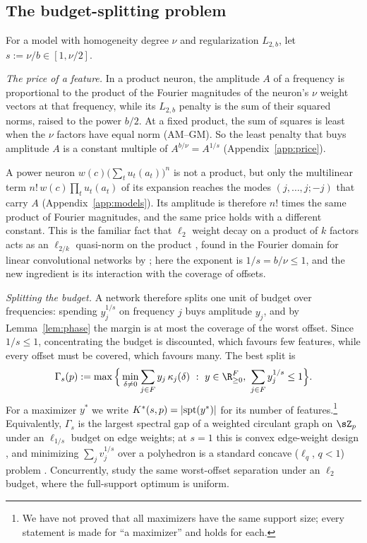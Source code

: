 \subsection{The budget-splitting problem}\label{sec:programme}

For a model with homogeneity degree $\nu$ and regularization $L_{2,b}$, let $s:=\nu/b\in[1,\nu/2]$.

\emph{The price of a feature.} In a product neuron, the amplitude $A$ of a frequency is proportional to the product of the Fourier magnitudes of the neuron's $\nu$ weight vectors at that frequency, while its $L_{2,b}$ penalty is the sum of their squared norms, raised to the power $b/2$. At a fixed product, the sum of squares is least when the $\nu$ factors have equal norm (AM--GM). So the least penalty that buys amplitude $A$ is a constant multiple of $A^{b/\nu}=A^{1/s}$ (Appendix~\ref{app:price}). 

A power neuron $w(c)\big(\sum_tu_t(a_t)\big)^n$ is not a product, but only the multilinear term $n!\,w(c)\prod_tu_t(a_t)$ of its expansion reaches the modes $(j,\dots,j;-j)$ that carry $A$ (Appendix~\ref{app:models}). Its amplitude is therefore $n!$ times the same product of Fourier magnitudes, and the same price holds with a different constant. This is the familiar fact that $\ell_2$ weight decay on a product of $k$ factors acts as an $\ell_{2/k}$ quasi-norm on the product \citep{hoff2017lasso,tibshirani2021equivalences,dai2021representation,kolb2025deep}, found in the Fourier domain for linear convolutional networks by \citet{gunasekar2018implicit}; here the exponent is $1/s=b/\nu\le1$, and the new ingredient is its interaction with the coverage of offsets.

\emph{Splitting the budget.} A network therefore splits one unit of budget over frequencies: spending $y_j^{1/s}$ on frequency $j$ buys amplitude $y_j$, and by Lemma~\ref{lem:phase} the margin is at most the coverage of the worst offset. Since $1/s\le1$, concentrating the budget is discounted, which favours few features, while every offset must be covered, which favours many. The best split is
\begin{equation}
  \Gamma_s(p):=\max\Big\{\min_{\delta\neq0}\sum_{j\in\Fp}y_j\,\cov{j}{\delta}\ :\ y\in\R_{\ge0}^{\Fp},\ \sum_{j\in\Fp}y_j^{1/s}\le1\Big\}.
  \label{eq:programme}
\end{equation}
For a maximizer $y^*$ we write $K^{*}(s,p)=|\mathrm{spt}(y^*)|$ for its number of features.\footnote{We have not proved that all maximizers have the same support size; every statement is made for ``a maximizer'' and holds for each.} Equivalently, $\Gamma_s$ is the largest spectral gap of a weighted circulant graph on $\sZ_p$ under an $\ell_{1/s}$ budget on edge weights; at $s=1$ this is convex edge-weight design \citep{boyd2006convex,sun2006fastest}, and minimizing $\sum_jv_j^{1/s}$ over a polyhedron is a standard concave ($\ell_q$, $q<1$) problem \citep{ge2011note}. Concurrently, \citet{kam2026symmetry} study the same worst-offset separation under an $\ell_2$ budget, where the full-support optimum is uniform.

